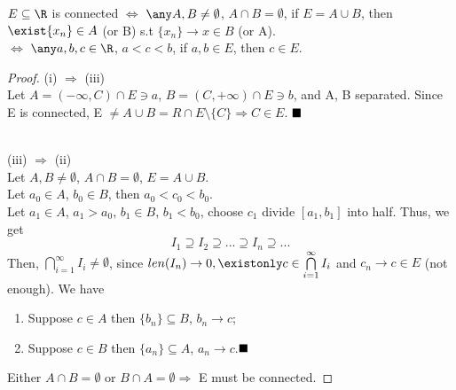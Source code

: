 \begin{theorem}
    $E \subseteq \R$ is connected  $\Leftrightarrow$ $\any A,B \neq \emptyset$, $A \cap B = \emptyset$, if $E = A \cup B$, then $\exist \{ x_n \} \in A$ (or B) s.t $\{ x_n \} \rightarrow x \in B$ (or A).\\
    \indent \indent \indent \indent \indent \indent \indent \indent$\Leftrightarrow$ $\any a,b,c \in \R$, $a<c<b$, if $a,b \in E$, then $c \in E$.
\end{theorem}
\begin{proof}
    (i) $\Rightarrow$ (iii) \\
    Let $A =  (-\infty, C) \cap E \ni a$, $B = (C, +\infty) \cap E \ni b$, and A, B separated. Since E is connected, E $\neq A \cup B = R \cap E \setminus \{C\} \Rightarrow C \in E$. $\hfill\blacksquare$

\\
    (iii) $\Rightarrow$ (ii)\\
    Let $A, B \neq \emptyset$, $A \cap B = \emptyset$, $E = A \cup B$. \\
    Let $a_0 \in A$, $b_0 \in B$, then $a_0<c_0<b_0$. \\
    Let $a_1 \in A$, $a_1>a_0$, $b_1 \in B$, $b_1<b_0$, choose $c_1$ divide $[a_1,b_1]$ into half. Thus, we get
    \[
        I_1 \supseteq I_2 \supseteq...\supseteq I_n \supseteq...
    \]
    Then, $\bigcap\limits_{i=1}^\infty I_i \neq \emptyset$, since $len(I_n) \rightarrow 0, \existonly c \in \bigcap\limits_{i=1}^\infty I_i$ and $c_n \rightarrow c \in E$ (not enough). We have 
    \begin{enumerate}
        \item Suppose $c \in A$ then $\{b_n\} \subseteq B$, $b_n \rightarrow c$;
        \item Suppose $c \in B$ then $\{a_n\} \subseteq A$, $a_n \rightarrow c$.$\hfill\blacksquare$
    \end{enumerate} 
    Either $A\cap B = \emptyset$ or $B \cap A = \emptyset \Rightarrow$ E must be connected.
\end{proof}
